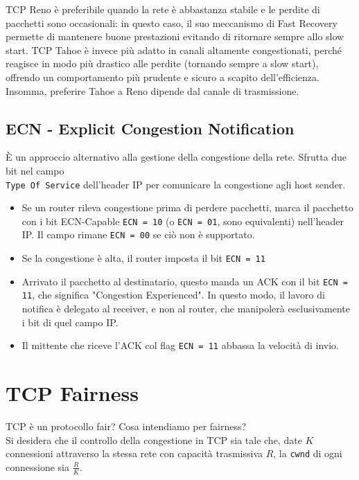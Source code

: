 TCP Reno è preferibile quando la rete è abbastanza stabile e le perdite di pacchetti sono occasionali: in questo caso, il suo meccanismo di Fast Recovery permette di mantenere buone prestazioni evitando di ritornare sempre allo slow start. TCP Tahoe è invece più adatto in canali altamente congestionati, perché reagisce in modo più drastico alle perdite (tornando sempre a slow start), offrendo un comportamento più prudente e sicuro a scapito dell'efficienza. Insomma, preferire Tahoe a Reno dipende dal canale di trasmissione.

\newpage


\subsection{ECN - Explicit Congestion Notification}
È un approccio alternativo alla gestione della congestione della rete. Sfrutta due bit nel campo \\ \verb|Type Of Service| dell'header IP per comunicare la congestione agli host sender.

\begin{itemize}
	\item Se un router rileva congestione prima di perdere pacchetti, marca il pacchetto con i bit ECN-Capable \verb|ECN = 10| (o \verb|ECN = 01|, sono equivalenti) nell'header IP. Il campo rimane \verb|ECN = 00| se ciò non è supportato.
	
	\item Se la congestione è alta, il router imposta il bit \verb|ECN = 11|
	
	\item Arrivato il pacchetto al destinatario, questo manda un ACK con il bit \verb|ECN = 11|, che significa "Congestion Experienced". In questo modo, il lavoro di notifica è delegato al receiver, e non al router, che manipolerà esclusivamente i bit di quel campo IP. 
	
	\item Il mittente che riceve l'ACK col flag \verb|ECN = 11| abbassa la velocità di invio.
\end{itemize}

\section{TCP Fairness}
TCP è un protocollo fair? Cosa intendiamo per fairness?\\
Si desidera che il controllo della congestione in TCP sia tale che, date $K$ connessioni attraverso la stessa rete con capacità trasmissiva $R$, la \verb|cwnd| di ogni connessione sia $\frac{R}{K}$.

